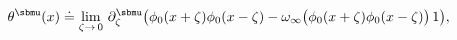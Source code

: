 \begin{equation} \label{balanced}
\theta^\sbmu (x)  \doteq 
\lim_{\zeta \rightarrow \,0} \,
\partial_\zeta^\sbmu \big( \phi_0 (x + \zeta)\phi_0 (x - \zeta) 
- \omega_\infty \big(\phi_0 (x + \zeta)\phi_0 (x - \zeta)\big) \, 1 \big),
\end{equation}

